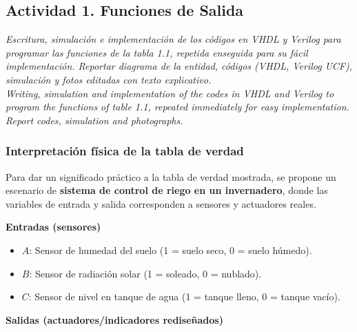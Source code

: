 
\subsection*{Actividad 1. Funciones de Salida}

\textit{\textcolor{Verde}{Escritura, simulación e implementación de los códigos en VHDL y Verilog para programar las funciones de la tabla 1.1, repetida enseguida para su fácil implementación. Reportar diagrama de la entidad, códigos (VHDL, Verilog UCF), simulación y fotos editadas con texto explicativo. \\
Writing, simulation and implementation of the codes in VHDL and Verilog to program the functions of table 1.1, repeated immediately for easy implementation. Report codes, simulation and photographs.}}

\subsubsection*{Interpretación física de la tabla de verdad}

Para dar un significado práctico a la tabla de verdad mostrada, se propone un escenario de 
\textbf{sistema de control de riego en un invernadero}, donde las variables de entrada y 
salida corresponden a sensores y actuadores reales.

\textbf{Entradas (sensores)}
\begin{itemize}
    \item $A$: Sensor de humedad del suelo (1 = suelo seco, 0 = suelo húmedo).
    \item $B$: Sensor de radiación solar (1 = soleado, 0 = nublado).
    \item $C$: Sensor de nivel en tanque de agua (1 = tanque lleno, 0 = tanque vacío).
\end{itemize}


\textbf{Salidas (actuadores/indicadores rediseñados)}

